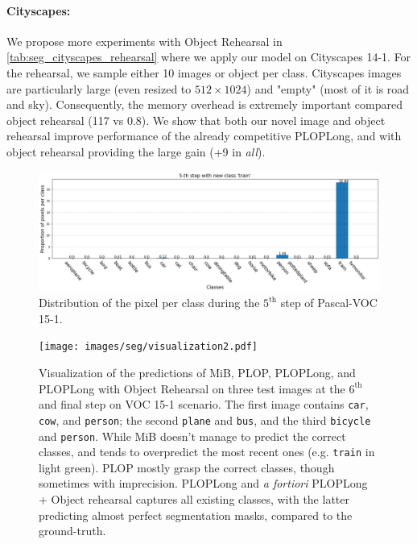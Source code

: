 \paragraph{Cityscapes:} We propose more experiments with Object Rehearsal in
\autoref{tab:seg_cityscapes_rehearsal} where we apply our model on Cityscapes 14-1. For the rehearsal,
we sample either 10 images or object per class. Cityscapes images are particularly large (even
resized to $512 \times 1024$)  and "empty" (most of it is road and sky). Consequently, the memory
overhead is extremely important compared object rehearsal (117 vs 0.8). We show that both our novel
image and object rehearsal improve performance of the already competitive PLOPLong, and with object
rehearsal providing the large gain (+9 \pp in \textit{all}).




\begin{figure}
    \centering
    \includegraphics[width=\linewidth]{images/seg/distribution_5step_voc.png}
    \vspace*{-0.3cm}
    \caption{Distribution of the pixel per class during the $5^{\text{th}}$ step of Pascal-VOC
        15-1.}
    \label{fig:seg_distribution_voc_5th}
\end{figure}

\begin{figure}
    \centering
    \texttt{[image: images/seg/visualization2.pdf]}
    \caption{Visualization of the predictions of MiB, PLOP, PLOPLong, and PLOPLong with Object
        Rehearsal on three test images at the $6^\text{th}$ and final step on VOC 15-1 scenario. The
        first image contains \texttt{car}, \texttt{cow}, and \texttt{person}; the second
        \texttt{plane} and \texttt{bus}, and the third \texttt{bicycle} and \texttt{person}. While
        MiB doesn't manage to predict the correct classes, and tends to overpredict the most recent
        ones (e.g. \texttt{train} in light green). PLOP mostly grasp the correct classes, though
        sometimes with imprecision. PLOPLong and \textit{a fortiori} PLOPLong + Object rehearsal
        captures all existing classes, with the latter predicting almost perfect segmentation masks,
        compared to the ground-truth.}
    \label{fig:seg_visualization}
\end{figure}

